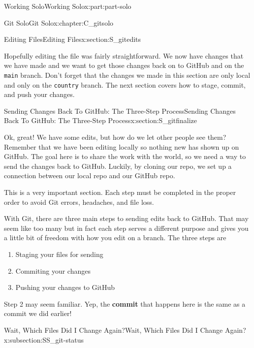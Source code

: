 \documentclass[oneside,10pt,]{book}
\newcommand{\mono}[1]{\texttt{#1}}
\newcommand{\terminology}[1]{\textbf{#1}}
\begin{document}
\begin{partptx}{Working Solo}{}{Working Solo}{}{}{x:part:part-solo}
\begin{chapterptx}{Git Solo}{}{Git Solo}{}{}{x:chapter:C_gitsolo}
\begin{sectionptx}{Editing Files}{}{Editing Files}{}{}{x:section:S_gitedits}
\begin{conclusion}{}%
Hopefully editing the file was fairly straightforward. We now have changes that we have made and we want to get those changes back on to GitHub and on the \mono{main} branch. Don't forget that the changes we made in this section are only local and only on the \mono{country} branch. The next section covers how to stage, commit, and push your changes.%
\end{conclusion}%
\end{sectionptx}
%
%
\typeout{************************************************}
\typeout{************************************************}
%
\begin{sectionptx}{Sending Changes Back To GitHub: The Three-Step Process}{}{Sending Changes Back To GitHub: The Three-Step Process}{}{}{x:section:S_gitfinalize}
%
%
\begin{introduction}{}%
Ok, great! We have some edits, but how do we let other people see them? Remember that we have been editing locally so nothing new has shown up on GitHub. The goal here is to share the work with the world, so we need a way to send the changes back to GitHub. Luckily, by cloning our repo, we set up a connection between our local repo and our GitHub repo.%
\par
This is a very important section. Each step must be completed in the proper order to avoid Git errors, headaches, and file loss.%
\par
With Git, there are three main steps to sending edits back to GitHub. That may seem like too many but in fact each step serves a different purpose and gives you a little bit of freedom with how you edit on a branch. The three steps are%
\begin{enumerate}
\item{}Staging your files for sending%
\item{}Commiting your changes%
\item{}Pushing your changes to GitHub%
\end{enumerate}
Step 2 may seem familiar. Yep, the \terminology{commit} that happens here is the same as a commit we did earlier!%
\end{introduction}%
%
%
\typeout{************************************************}
\typeout{************************************************}
%
\begin{subsectionptx}{Wait, Which Files Did I Change Again?}{}{Wait, Which Files Did I Change Again?}{}{}{x:subsection:SS_git-status}

\end{subsectionptx}
\end{sectionptx}
\end{chapterptx}
\end{partptx}
\end{document}

